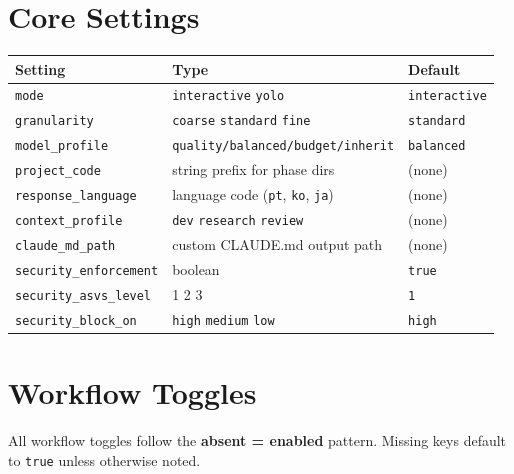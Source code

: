\documentclass[10pt,letterpaper]{article}
\begin{document}
\section{Core Settings}

\begin{longtable}{@{}l l l@{}}
\toprule
\textbf{\footnotesize Setting} & \textbf{\footnotesize Type} & \textbf{\footnotesize Default} \\
\midrule
\endhead
\texttt{mode} & \texttt{interactive} \textbar{} \texttt{yolo} & \texttt{interactive} \\
\texttt{granularity} & \texttt{coarse} \textbar{} \texttt{standard} \textbar{} \texttt{fine} & \texttt{standard} \\
\texttt{model\_profile} & \texttt{quality/balanced/budget/inherit} & \texttt{balanced} \\
\texttt{project\_code} & string prefix for phase dirs & (none) \\
\texttt{response\_language} & language code (\texttt{pt}, \texttt{ko}, \texttt{ja}) & (none) \\
\texttt{context\_profile} & \texttt{dev} \textbar{} \texttt{research} \textbar{} \texttt{review} & (none) \\
\texttt{claude\_md\_path} & custom CLAUDE.md output path & (none) \\
\texttt{security\_enforcement} & boolean & \texttt{true} \\
\texttt{security\_asvs\_level} & 1 \textbar{} 2 \textbar{} 3 & \texttt{1} \\
\texttt{security\_block\_on} & \texttt{high} \textbar{} \texttt{medium} \textbar{} \texttt{low} & \texttt{high} \\
\bottomrule
\end{longtable}

\section{Workflow Toggles}

All workflow toggles follow the \textbf{absent = enabled} pattern. Missing keys default to \texttt{true} unless otherwise noted.
\end{document}
